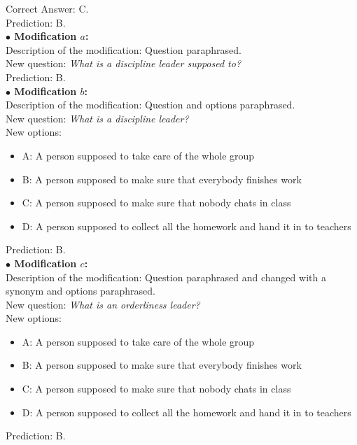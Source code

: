 Correct Answer: C. \\ 
Prediction: B. \\
\textbf{$\bullet$ Modification $a$:} \\
Description of the modification: Question paraphrased.\\
New question: \emph{What is a discipline leader supposed to?} \\
Prediction: B. \\
\textbf{$\bullet$ Modification $b$:} \\
Description of the modification: Question and options paraphrased.\\
New question: \emph{What is a discipline leader?} \\
New options:
\begin{itemize}
 \item A: A person supposed to take care of the whole group
 \item B: A person supposed to make sure that everybody finishes work
 \item C: A person supposed to make sure that nobody chats in class
 \item D: A person supposed to collect all the homework and hand it in to teachers
\end{itemize}
Prediction: B. \\
\textbf{$\bullet$ Modification $c$:} \\
Description of the modification: Question paraphrased and changed with a synonym and options paraphrased.\\
New question: \emph{What is an orderliness leader?} \\
New options:
\begin{itemize}
 \item A: A person supposed to take care of the whole group
 \item B: A person supposed to make sure that everybody finishes work
 \item C: A person supposed to make sure that nobody chats in class
 \item D: A person supposed to collect all the homework and hand it in to teachers
\end{itemize}
Prediction: B.
